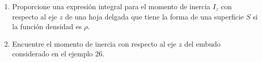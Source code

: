\item 
    \begin{enumerate}
        \item[(a)] Proporcione una expresión integral para el momento de inercia $I_z$ con respecto al eje $z$ de una hoja delgada que tiene la forma de una superficie $S$ si la función densidad es $\rho$.
        \item[(b)] Encuentre el momento de inercia con respecto al eje $z$ del embudo considerado en el ejemplo 26.
    \end{enumerate}

